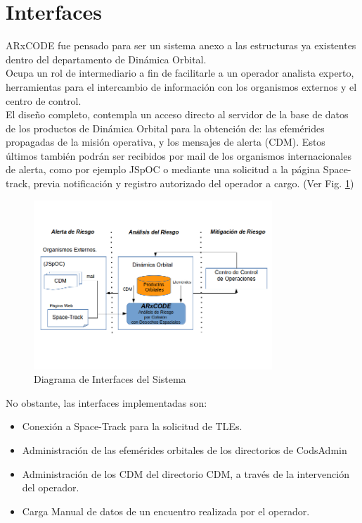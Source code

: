 \section{Interfaces}
ARxCODE fue pensado para ser un sistema anexo a las estructuras ya existentes dentro del departamento de Din\'amica Orbital.\\
Ocupa un rol de intermediario a fin de facilitarle a un operador analista experto, herramientas para el intercambio de informaci\'on con los organismos externos y el centro de control.\\
El dise\~no completo, contempla un acceso directo al servidor de la base de datos de los productos de Din\'amica Orbital para la obtenci\'on de: las efem\'erides propagadas de la misi\'on operativa, y los mensajes de alerta (CDM). Estos \'ultimos tambi\'en podr\'an ser recibidos por mail de los organismos internacionales de alerta, como por ejemplo JSpOC o mediante una solicitud a la p\'agina Space-track, previa notificaci\'on y registro autorizado del operador a cargo. (Ver Fig. \ref{fig:interfaces})\\

\begin{figure}
\centering
  \includegraphics[width=0.8\textwidth]{imagenes/interfasessistemas}
  \caption[Diagrama de Interfaces del Sistema]{Diagrama de Interfaces del Sistema}
  \label{fig:interfaces}
\end{figure}

No obstante, las interfaces implementadas son:\\

\begin{itemize}
\itemsep0em
 \item Conexi\'on a Space-Track para la solicitud de TLEs.
 \item Administraci\'on de las efem\'erides orbitales de los directorios de CodsAdmin
 \item Administraci\'on de los CDM del directorio CDM, a trav\'es de la intervenci\'on del operador.
 \item Carga Manual de datos de un encuentro realizada por el operador.
\end{itemize}

